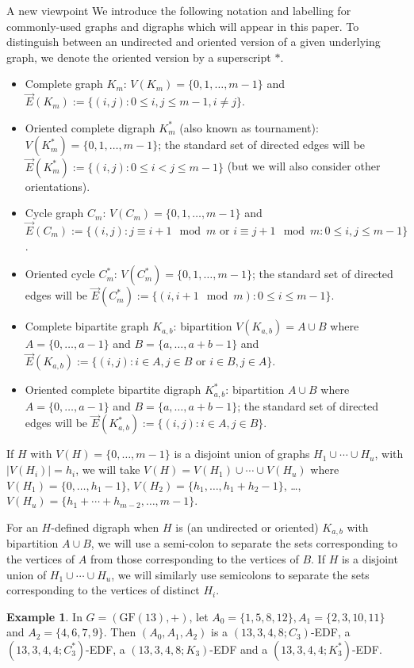 \documentclass[12pt, a4paper]{article}
\theoremstyle{definition}
\newtheorem{example}[theorem]{Example}
\newcommand{\E}{\overrightarrow{E}}
\begin{document}
\begin{section}{A new viewpoint}
We introduce the following notation and labelling for commonly-used graphs and digraphs which will appear in this paper. To distinguish between an undirected and oriented version of a given underlying graph, we denote the oriented version by a superscript $*$.
\begin{itemize}
\item  Complete graph $K_m$:  $V(K_m)=\{0,1,\ldots, m-1\}$ and  $\E(K_m):=\{ (i,j): 0 \leq i,j\leq m-1, i \neq j \}$. 
\item Oriented complete digraph $K_m^*$ (also known as tournament): $V(K_m^*)=\{0,1,\ldots, m-1\}$; the standard set of directed edges will be  $\E(K_m^*):=\{ (i,j): 0 \leq i <j\leq m-1 \}$ (but we will also consider other orientations).
\item Cycle graph $C_m$:  $V(C_m)=\{0,1,\ldots, m-1\}$ and  $\E(C_m):=\{ (i,j) : j \equiv i+1 \mod m \mbox{ or } i \equiv j+1 \mod m: 0 \leq i, j \leq m-1 \}$. 
\item Oriented cycle $C_m^*$:  $V(C_m^*)=\{0,1,\ldots, m-1\}$; the standard set of directed edges will be  $\E(C_m^*):=\{ (i,i+1 \mod m): 0 \leq i \leq m-1 \}$. 
\item Complete bipartite graph $K_{a,b}$: bipartition $V(K_{a,b})=A \cup B$ where $A=\{0,\ldots,a-1\}$ and $B=\{a,\ldots, a+b-1\}$ and $\E(K_{a,b}):=\{ (i,j): i \in A, j \in B \mbox{ or } i \in B, j \in A\}$. 
\item Oriented complete bipartite digraph $K_{a,b}^*$: bipartition $A \cup B$ where $A=\{0,\ldots,a-1\}$ and $B=\{a,\ldots, a+b-1\}$; the standard set of directed edges will be $\E(K_{a,b}^*):=\{ (i,j): i \in A, j \in B \}$.
\end{itemize}

If $H$ with $V(H)=\{0,\ldots,m-1\}$ is a disjoint union of graphs $H_1 \cup \cdots \cup H_u$, with $|V(H_i)|=h_i$, we will take $V(H)=V(H_1) \cup \cdots \cup V(H_u)$ where $V(H_1)=\{0,\ldots, h_1-1\}$, $V(H_2)= \{h_1,\ldots, h_1+h_2-1\}$, \ldots, $V(H_u)=\{h_1+\cdots + h_{m-2}, \ldots, m -1\}$.

For an $H$-defined digraph when $H$ is (an undirected or oriented) $K_{a,b}$ with bipartition $A \cup B$, we will use a semi-colon to separate the sets corresponding to the vertices of $A$ from those corresponding to the vertices of $B$.  If $H$ is a disjoint union of $H_1 \cup \cdots \cup H_u$, we will similarly use semicolons to separate the sets corresponding to the vertices of distinct $H_i$.

\begin{example}\label{ex:Z13}
In $G=(\mathrm{GF}(13),+)$, let $A_0=\{1,5,8,12\}, A_1=\{2,3,10,11\}$ and $A_2=\{4,6,7,9\}$.  Then $(A_0,A_1,A_2)$ is a $(13,3,4,8; C_3)$-EDF, a $(13,3,4,4; C_3^*)$-EDF, a $(13,3,4,8; K_3)$-EDF and a $(13,3,4,4; K_3^*)$-EDF.
\end{example}   



\end{section}
\end{document}
